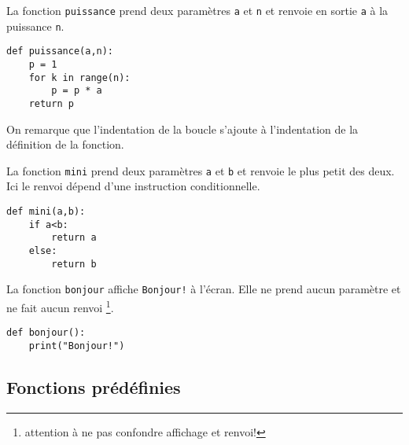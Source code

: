\begin{example}
	La fonction \texttt{puissance} prend deux paramètres \texttt{a} et \texttt{n} et renvoie en sortie \texttt{a} à la puissance \texttt{n}.
	\begin{center}
	\begin{varwidth}[t]{.5\textwidth}
		\begin{lstlisting}[language=iPython,linewidth = 6cm]
def puissance(a,n):
    p = 1
    for k in range(n):
        p = p * a
    return p
\end{lstlisting}\end{varwidth}\end{center}
On remarque que l'indentation de la boucle s'ajoute à l'indentation de la définition de la fonction.
\end{example}

\begin{example}
	La fonction \texttt{mini} prend deux paramètres \texttt{a} et \texttt{b} et renvoie le plus petit des deux. Ici le renvoi dépend d'une instruction conditionnelle.
	\begin{center}
	\begin{varwidth}[t]{.5\textwidth}
		\begin{lstlisting}[language=iPython,linewidth = 5cm]
def mini(a,b):
    if a<b:
        return a
    else:
        return b
\end{lstlisting}\end{varwidth}\end{center}
\end{example}

\begin{example}
	La fonction \texttt{bonjour} affiche \texttt{Bonjour!} à l'écran. Elle ne prend aucun paramètre et ne fait aucun renvoi \footnote{attention à ne pas confondre affichage et renvoi!}.
		\begin{center}
		\begin{varwidth}[t]{.5\textwidth}
			\begin{lstlisting}[language=iPython,linewidth = 6cm]
def bonjour():
    print("Bonjour!")
\end{lstlisting}\end{varwidth}\end{center}
\end{example}

\subsection{Fonctions prédéfinies}\label{fonctions_predefinies}

